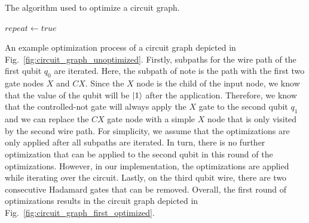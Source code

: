 \begin{algorithm}
    \caption{The algorithm used to optimize a circuit graph.}
    \label{alg:concept_optimizationAlgorithm}
    $repeat \gets true$\;
\end{algorithm}

An example optimization process of a circuit graph depicted in Fig.~\ref{fig:circuit_graph_unoptimized}. Firstly, subpaths for the wire path of the first qubit $q_0$ are iterated. Here, the subpath of note is the path with the first two gate nodes $X$ and $CX$. Since the $X$ node is the child of the input node, we know that the value of the qubit will be $\ket{1}$ after the application. Therefore, we know that the controlled-not gate will always apply the $X$ gate to the second qubit $q_1$ and we can replace the $CX$ gate node with a simple $X$ node that is only visited by the second wire path. For simplicity, we assume that the optimizations are only applied after all subpaths are iterated. In turn, there is no further optimization that can be applied to the second qubit in this round of the optimizations. However, in our implementation, the optimizations are applied while iterating over the circuit. Lastly, on the third qubit wire, there are two consecutive Hadamard gates that can be removed. Overall, the first round of optimizations results in the circuit graph depicted in Fig.~\ref{fig:circuit_graph_first_optimized}. 
 

